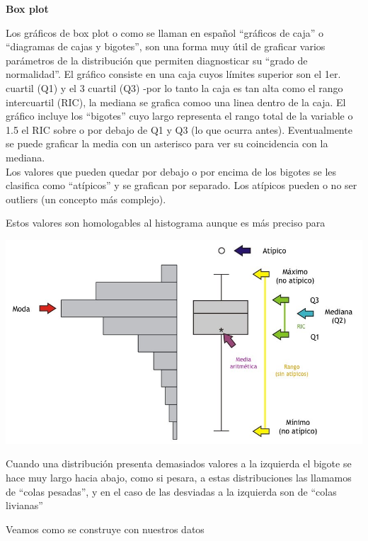 \documentclass[
]{book}
\newenvironment{Shaded}{\begin{snugshade}}{\end{snugshade}}
\newcommand{\FunctionTok}[1]{\textcolor[rgb]{0.00,0.00,0.00}{#1}}
\newcommand{\NormalTok}[1]{#1}
\newcommand{\SpecialCharTok}[1]{\textcolor[rgb]{0.00,0.00,0.00}{#1}}
\begin{document}
\textbf{Box plot}

Los gráficos de box plot o como se llaman en español ``gráficos de caja'' o ``diagramas de cajas y bigotes'', son una forma muy útil de graficar varios parámetros de la distribución que permiten diagnosticar su ``grado de normalidad''. El gráfico consiste en una caja cuyos límites superior son el 1er. cuartil (Q1) y el 3 cuartil (Q3) -por lo tanto la caja es tan alta como el rango intercuartil (RIC), la mediana se grafica comoo una linea dentro de la caja. El gráfico incluye los ``bigotes'' cuyo largo representa el rango total de la variable o 1.5 el RIC sobre o por debajo de Q1 y Q3 (lo que ocurra antes). Eventualmente se puede graficar la media con un asterisco para ver su coincidencia con la mediana.\\
Los valores que pueden quedar por debajo o por encima de los bigotes se les clasifica como ``atípicos'' y se grafican por separado. Los atípicos pueden o no ser outliers (un concepto más complejo).

Estos valores son homologables al histograma aunque es más preciso para

\includegraphics[width=12.01in]{img/box}

Cuando una distribución presenta demasiados valores a la izquierda el bigote se hace muy largo hacia abajo, como si pesara, a estas distribuciones las llamamos de ``colas pesadas'', y en el caso de las desviadas a la izquierda son de ``colas livianas''

Veamos como se construye con nuestros datos

\begin{Shaded}
\end{Shaded}
\end{document}
